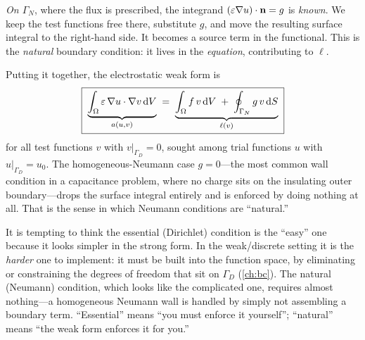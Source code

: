 \emph{On $\Gamma_N$}, where the flux is prescribed, the integrand
$(\varepsilon\nabla u)\cdot\mathbf{n} = g$ is \emph{known}. We keep the test functions
free there, substitute $g$, and move the resulting surface integral to the
right-hand side. It becomes a source term in the functional. This is the
\emph{natural} boundary condition: it lives in the \emph{equation}, contributing
to $\ell$.

Putting it together, the electrostatic weak form is
\begin{equation}
  \boxed{\;
  \underbrace{\int_\Omega \varepsilon\,\nabla u\cdot\nabla v\,\mathrm{d}V}_{a(u,v)}
  \;=\;
  \underbrace{\int_\Omega f\,v\,\mathrm{d}V \;+\; \oint_{\Gamma_N} g\,v\,\mathrm{d}S}_{\ell(v)}
  \;}
  \label{eq:3d-weak}
\end{equation}
for all test functions $v$ with $v|_{\Gamma_D}=0$, sought among trial functions
$u$ with $u|_{\Gamma_D}=u_0$. The homogeneous-Neumann case $g=0$---the most
common wall condition in a capacitance problem, where no charge sits on the
insulating outer boundary---drops the surface integral entirely and is enforced
by doing nothing at all. That is the sense in which Neumann conditions are
``natural.''

\begin{pitfall}
It is tempting to think the essential (Dirichlet) condition is the ``easy'' one
because it looks simpler in the strong form. In the weak/discrete setting it is
the \emph{harder} one to implement: it must be built into the function space, by
eliminating or constraining the degrees of freedom that sit on $\Gamma_D$
(\cref{ch:bc}). The natural (Neumann) condition, which looks like the
complicated one, requires almost nothing---a homogeneous Neumann wall is handled
by simply not assembling a boundary term. ``Essential'' means ``you must enforce
it yourself''; ``natural'' means ``the weak form enforces it for you.''
\end{pitfall}

